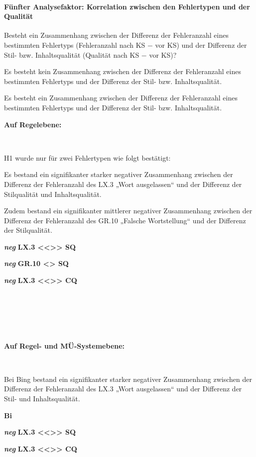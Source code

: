 \paragraph*{Fünfter Analysefaktor: Korrelation zwischen den Fehlertypen und der Qualität}
\begin{description}[font=\normalfont\bfseries]
\item [Fragestellung:] Besteht ein Zusammenhang zwischen der Differenz der Fehleranzahl eines bestimmten Fehlertyps (Fehleranzahl nach KS $-$ vor KS) und der Differenz der Stil- bzw. Inhaltsqualität (Qualität nach KS $-$ vor KS)?
\item [H0 --] Es besteht kein Zusammenhang zwischen der Differenz der Fehleranzahl eines bestimmten Fehlertyps und der Differenz der Stil- bzw. Inhaltsqualität.
\item [H1 --] Es besteht ein Zusammenhang zwischen der Differenz der Fehleranzahl eines bestimmten Fehlertyps und der Differenz der Stil- bzw. Inhaltsqualität.
\item [Resultat]
\end{description}
\noindent
\parbox[t]{.7\textwidth}{\textbf{Auf Regelebene:}}\\
\noindent
\parbox[t]{.7\textwidth}{
H1 wurde nur für zwei Fehlertypen wie folgt bestätigt:

Es bestand ein signifikanter starker negativer Zusammenhang zwischen der Differenz der Fehleranzahl des LX.3 „Wort ausgelassen“ und der Differenz der Stilqualität und Inhaltsqualität.

Zudem bestand ein signifikanter mittlerer negativer Zusammenhang zwischen der Differenz der Fehleranzahl des GR.10 „Falsche Wortstellung“ und der Differenz der Stilqualität.
}
\parbox[t]{.04\textwidth}{}
\colorbox{smGreen}{\parbox[t]{.25\textwidth}{
\textbf{\textit{neg} }\textbf{LX.3 <{}<{}>{}> SQ}

{ \textbf{\textit{neg}} \textbf{GR.10 <> SQ}}

 \textbf{\textit{neg}} \textbf{LX.3 <{}<{}>{}> CQ}\\
 \\
 \\
 \\
 \\
 \\
}}

\noindent
\parbox[t]{.7\textwidth}{\textbf{Auf Regel- und MÜ-Systemebene:}}\\
\noindent
\parbox[t]{.7\textwidth}{
Bei Bing bestand ein signifikanter starker negativer Zusammenhang zwischen der Differenz der Fehleranzahl des LX.3 „Wort ausgelassen“ und der Differenz der Stil- und Inhaltsqualität.
}
\parbox[t]{.04\textwidth}{}
\colorbox{smGreen}{\parbox[t]{.25\textwidth}{
\textbf{Bi}

{ \textbf{\textit{neg}} \textbf{LX.3 <{}<{}>{}> SQ}}

 \textbf{\textit{neg}} \textbf{LX.3 <{}<{}>{}> CQ}\\
}}


